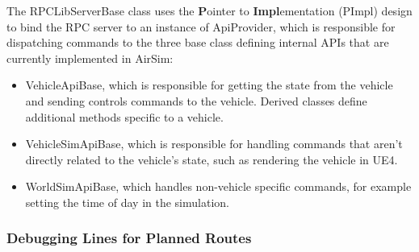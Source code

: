 The RPCLibServerBase class uses the \textbf{P}ointer to \textbf{Impl}ementation (PImpl) design to bind the RPC server to an instance of ApiProvider, which is responsible for dispatching commands to the three base class defining internal APIs that are currently implemented in AirSim:
\begin{itemize}
    \item VehicleApiBase, which is responsible for getting the state from the vehicle and sending controls commands to the vehicle. Derived classes define additional methods specific to a vehicle.
    \item VehicleSimApiBase, which is responsible for handling commands that aren't directly related to the vehicle's state, such as rendering the vehicle in UE4.
    \item WorldSimApiBase, which handles non-vehicle specific commands, for example setting the time of day in the simulation.
\end{itemize}

\pagebreak
\subsubsection{Debugging Lines for Planned Routes}

